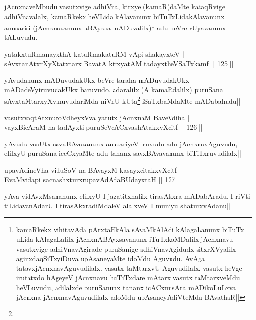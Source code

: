\begin{artha}
jAcnxnaveMbudu vasutxvige adhiVna, kirxye (kamaR)daMte kataqRvige adhiVnavalalx, kamaRkekx heVLida kAlavanunx biTuTxLidakAlavanunx anusarisi (jAcnxnavanunx aBAyxsa mADuvalilx)\footnote[1]{kamaRkekx vihitavAda pArxtaHkAla sAyaMkAlAdi kAlagaLanunx biTuTx uLida kAlagaLalilx jAcnxnABAyxsavanunx iTuTxkoMDalilx jAcnxnavu vasutxvige adhiVnavAgirade puruSanige adhiVnavAgidudx sitxrXVyalilx aginxdaqSiTxyiDuva upAsaneyaMte idoMdu Aguvudu. AvAga tatavxjAcnxnavAguvudilalx. vasutx taMtarxvU Aguvudilalx. vasutx heVge irutatxdo hAgeyeV jAcnxnavu huTiTxdare mAtarx vasutx taMtarxveMdu heVLuvudu, adilalxde puruSanunx tananx icACxnusAra mADikoLuLxva jAcnxna jAcnxnavAguvudilalx adoMdu upAsaneyAdiVteMdu BAvathaR||} adu beVre rUpavanunx tALuvudu.
\end{artha}


\begin{shl}
yatakxtuRmanayxthA katuRmakatuRM vA\s pi shakayxteV |\\
sAvxtanAtxrXyXtatxtarx BavatA kirxyatAM tadayxtheVSaTxkamf \hfill || 125 ||
\end{shl}

\begin{artha}
yAvudanunx mADuvudakUkx beVre taraha mADuvudakUkx mADadeVyiruvudakUkx baruvudo. adaralilx (A kamaRdalilx) puruSana sAvxtaMtarxyXvinuvudariMda niVnU-kUta\footnote[1]{} iSaTxbaMdaMte mADabahudu||
\end{artha}

\begin{shl}
vasutxvaqtAtxnuroVdheyxVva yatutx jAcnxnaM BaveVdiha |\\
vayxBicAraM na tadAyxti puruSeVcACxvashAtakxvXcitf \hfill || 126 ||
\end{shl}	

\begin{artha}
yAvudu vasUtx savxBAvavanunx anusariyeV iruvudo adu jAcnxnavAguvudu, elilxyU puruSana iceCxyaMte adu tananx savxBAvavanunx biTiTxruvudilalx||
\end{artha}

\begin{shl}
upavAdineVha viduSoV na BAvayxM kasayxcitakxvXcitf |\\
EvaMvidapi sacnashxturxrupavAdAdaBUdayxtaH \hfill || 127 ||
\end{shl}

\begin{artha}
yAva vidAvxMsananunx elilxyU I jagatitxnalilx tirasAkxra mADabAradu, I riVti tiLidavanAdarU I tirasAkxradiMdaleV alalxveV I muniyu shaturxvAdanu||
\end{artha}

